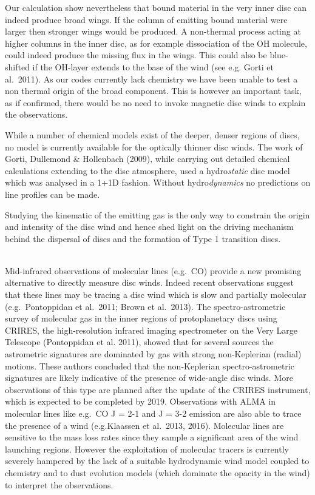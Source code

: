 \documentclass[10pt,fleqn,twoside]{article}
\begin{document}
Our calculation show nevertheless that bound material in the very
inner disc can indeed produce broad wings. If the column of emitting
bound material were larger then stronger wings would be produced. A
non-thermal process acting at higher columns in the inner disc, as for
example dissociation of the OH molecule, could
indeed produce the missing flux in the wings. This could also be
blue-shifted if the OH-layer extends to the base of the wind (see e.g.
Gorti et al.\ 2011). As our codes currently
lack chemistry we have been unable to test a non thermal
origin of the broad component. This is however an important task, as
if confirmed, there would be no need to invoke magnetic disc winds to
explain the observations.  

 While a number of chemical models exist
of the deeper, denser regions of discs, no model is currently
available for the optically thinner disc winds. The work of Gorti, Dullemond \&
Hollenbach (2009), while carrying out detailed chemical calculations
extending to the disc atmosphere, used a hydro{\it static} disc model which
was analysed in a 1+1D fashion. Without hydro{\it dynamics} no predictions
on line profiles can be made.  

Studying the kinematic of the emitting gas is the only way to
constrain the origin and intensity of the disc wind and hence shed
light on the driving mechanism behind the dispersal of discs and the
formation of Type 1 transition discs. 

\vspace{0.5em}{\Tcol\bf Molecular species}\\
Mid-infrared observations of molecular lines (e.g.\ CO) provide a new
promising alternative to directly measure disc winds. Indeed recent
observations suggest that these lines may be tracing a disc wind which
is slow and partially molecular (e.g.\ Pontoppidan et al.\ 2011; Brown et al.\ 2013). 
The spectro-astrometric survey of molecular gas in the inner regions of
protoplanetary discs using CRIRES, the high-resolution infrared
imaging spectrometer on the Very Large Telescope (Pontoppidan et
al. 2011), showed that for several sources the astrometric signatures
are dominated by gas with strong non-Keplerian (radial) motions. These
authors concluded that the non-Keplerian spectro-astrometric
signatures are likely indicative of the presence of wide-angle disc
winds. 
More observations of this type are planned after the update of
the CRIRES instrument, which is expected to be completed by
2019. Observations with ALMA in molecular lines like e.g.\ CO J = 2-1
and J = 3-2 emission are also able to trace the presence of a wind (e.g.Klaassen et al.\ 2013, 2016).  
Molecular lines are sensitive to the mass loss rates since they
sample a significant area of the wind launching regions. However the
exploitation of molecular tracers is currently severely hampered by
the lack of a suitable hydrodynamic wind model coupled to chemistry
and to dust evolution models (which dominate the opacity in the wind)
to interpret the observations.
\end{document}
